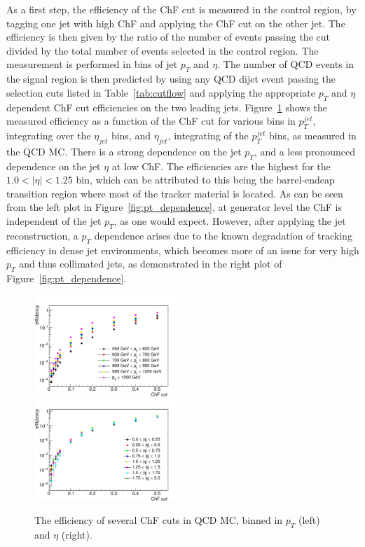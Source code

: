 As a first step, the efficiency of the ChF cut is measured in the control region, by tagging one jet with high ChF and applying the ChF cut on the other jet. The efficiency is then given by the ratio of the number of events passing the cut divided by the total number of events selected in the control region. The measurement is performed in bins of jet $p_T$ and $\eta$. The number of \ac{QCD} events in the signal region is then predicted by using any \ac{QCD} dijet event passing the selection cuts listed in Table~\ref{tab:cutflow} and applying the appropriate $p_T$ and $\eta$ dependent ChF cut efficiencies on the two leading jets. Figure~\ref{fig:efficiencies} shows the measured efficiency as a function of the ChF cut for various bins in $p_T^{jet}$, integrating over the $\eta_{jet}$ bins, and $\eta_{jet}$, integrating of the $p_T^{jet}$ bins, as measured in the \ac{QCD} MC. There is a strong dependence on the jet $p_T$, and a less pronounced dependence on the jet $\eta$ at low ChF. The efficiencies are the highest for the $1.0 < |\eta| < 1.25$ bin, which can be attributed to this being the barrel-endcap transition region where most of the tracker material is located. As can be seen from the left plot in Figure~\ref{fig:pt_dependence}, at generator level the ChF is independent of the jet $p_T$, as one would expect. However, after applying the jet reconstruction, a $p_T$ dependence arises due to the known degradation of tracking efficiency in dense jet environments, which becomes more of an issue for very high $p_T$ and thus collimated jets, as demonstrated in the right plot of Figure~\ref{fig:pt_dependence}.

\begin{figure}[ht]
  \centering
  \includegraphics[width=0.5\textwidth]{figures/eff1D_pt_newtrigger.pdf}\hfill%
  \includegraphics[width=0.5\textwidth]{figures/eff1D_eta_newtrigger.pdf}
  \caption{The efficiency of several ChF cuts in \ac{QCD} MC, binned in $p_T$ (left) and $\eta$ (right).}
  \label{fig:efficiencies}
\end{figure}

